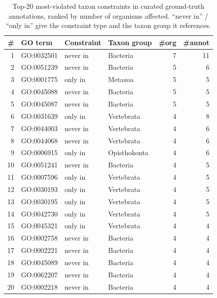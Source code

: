 \begin{table}[!h]
\centering
\caption{Top-20 most-violated taxon constraints in curated ground-truth annotations, ranked by number of organisms affected. ``never in'' / ``only in'' give the constraint type and the taxon group it references.}
\label{tab:supp-violated}
\small
\setlength{\tabcolsep}{4pt}
\begin{tabular}{rlll rr}
\toprule
\# & GO term & Constraint & Taxon group & \#org & \#annot \\
\midrule
1  & GO:0032501 & never in & Bacteria     & 7 & 11 \\
2  & GO:0051239 & never in & Bacteria     & 5 & 6 \\
3  & GO:0001775 & only in  & Metazoa      & 5 & 5 \\
4  & GO:0045088 & never in & Bacteria     & 5 & 5 \\
5  & GO:0045087 & never in & Bacteria     & 5 & 5 \\
6  & GO:0031639 & only in  & Vertebrata   & 4 & 8 \\
7  & GO:0044003 & never in & Vertebrata   & 4 & 6 \\
8  & GO:0044068 & never in & Vertebrata   & 4 & 6 \\
9  & GO:0006915 & only in  & Opisthokonta & 4 & 6 \\
10 & GO:0051241 & never in & Bacteria     & 4 & 5 \\
11 & GO:0007596 & only in  & Vertebrata   & 4 & 5 \\
12 & GO:0030193 & only in  & Vertebrata   & 4 & 5 \\
13 & GO:0030195 & only in  & Vertebrata   & 4 & 5 \\
14 & GO:0042730 & only in  & Vertebrata   & 4 & 5 \\
15 & GO:0045321 & only in  & Vertebrata   & 4 & 4 \\
16 & GO:0002758 & never in & Bacteria     & 4 & 4 \\
17 & GO:0002221 & never in & Bacteria     & 4 & 4 \\
18 & GO:0045089 & never in & Bacteria     & 4 & 4 \\
19 & GO:0062207 & never in & Bacteria     & 4 & 4 \\
20 & GO:0002218 & never in & Bacteria     & 4 & 4 \\
\bottomrule
\end{tabular}
\end{table}
